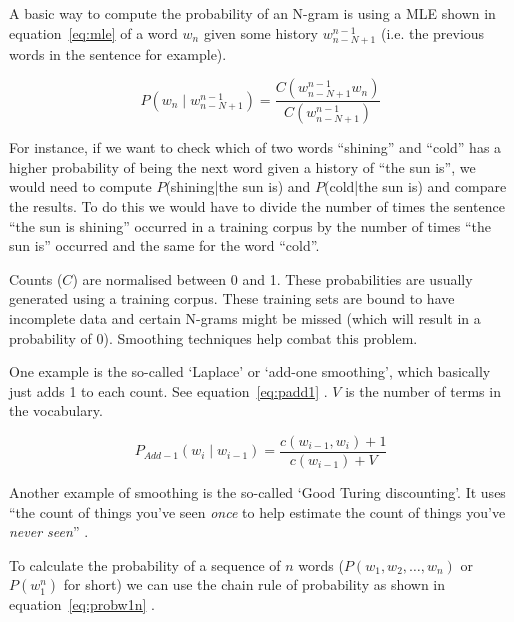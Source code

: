A basic way to compute the probability of an N-gram is using a \ac{MLE} shown in equation~\ref{eq:mle}\marginpar{$\bm{\Sigma}$~\ref{eq:mle}} \autocite{Jurafsky2009} of a word $w_n$ given some history $w_{n-N+1}^{n-1}$ (i.e. the previous words in the sentence for example).

\begin{equation}
  P(w_n \mid w_{n-N+1}^{n-1}) = \frac{C(w_{n-N+1}^{n-1} w_n)}{C(w_{n-N+1}^{n-1})}
  \label{eq:mle}
\end{equation}

For instance, if we want to check which of two words ``shining'' and ``cold'' has a higher probability of being the next word given a history of ``the sun is'', we would need to compute $P$(shining|the sun is) and $P$(cold|the sun is) and compare the results. To do this we would have to divide the number of times the sentence ``the sun is shining'' occurred in a training corpus by the number of times ``the sun is'' occurred and the same for the word ``cold''.

Counts ($C$) are normalised between 0 and 1. These probabilities are usually generated using a training corpus. These training sets are bound to have incomplete data and certain N-grams might be missed (which will result in a probability of 0). Smoothing techniques help combat this problem. 

One example is the so-called `Laplace' or `add-one smoothing', which basically just adds 1 to each count. See equation~\ref{eq:padd1}\marginpar{$\bm{\Sigma}$~\ref{eq:padd1}} \autocite{Jurafsky2009}. $V$ is the number of terms in the vocabulary.

\begin{equation}
  P_{Add-1}(w_i \mid w_{i-1}) = \frac{c(w_{i-1}, w_i) + 1}{c(w_{i-1}) + V}
  \label{eq:padd1}
\end{equation}

Another example of smoothing is the so-called `Good Turing discounting'. It uses ``the count of things you've seen \textit{once} to help estimate the count of things you've \textit{never seen}'' \autocite[their emphasis]{Jurafsky2009}.

\spirals

To calculate the probability of a sequence of $n$ words ($P(w_1,w_2,\ldots,w_n)$ or $P(w_1^n)$ for short) we can use the chain rule of probability as shown in equation~\ref{eq:probw1n}\marginpar{$\bm{\Sigma}$~\ref{eq:probw1n}} \autocite{Jurafsky2009}.

